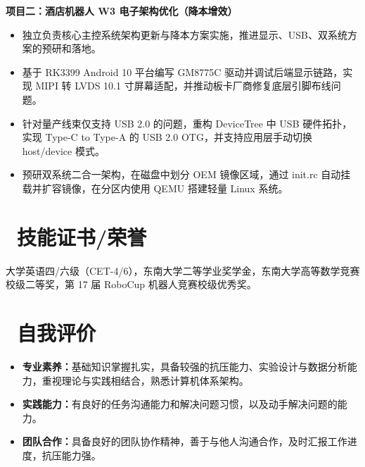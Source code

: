 \documentclass{resume}
\begin{document}
\textbf{项目二：酒店机器人 W3 电子架构优化（降本增效）}
\begin{itemize}
  \item 独立负责核心主控系统架构更新与降本方案实施，推进显示、USB、双系统方案的预研和落地。
  \item 基于 RK3399 Android 10 平台编写 GM8775C 驱动并调试后端显示链路，实现 MIPI 转 LVDS 10.1 寸屏幕适配，并推动板卡厂商修复底层引脚布线问题。
  \item 针对量产线束仅支持 USB 2.0 的问题，重构 DeviceTree 中 USB 硬件拓扑，实现 Type-C to Type-A 的 USB 2.0 OTG，并支持应用层手动切换 host/device 模式。
  \item 预研双系统二合一架构，在磁盘中划分 OEM 镜像区域，通过 init.rc 自动挂载并扩容镜像，在分区内使用 QEMU 搭建轻量 Linux 系统。
\end{itemize}


\section{\faCertificate\ 技能证书/荣誉}
大学英语四/六级（CET-4/6），东南大学二等学业奖学金，东南大学高等数学竞赛校级二等奖，第 17 届 RoboCup 机器人竞赛校级优秀奖。

\section{\faInfo\ 自我评价}
\begin{itemize}[parsep=0.5ex]
  \item \textbf{专业素养：}基础知识掌握扎实，具备较强的抗压能力、实验设计与数据分析能力，重视理论与实践相结合，熟悉计算机体系架构。
  \item \textbf{实践能力：}有良好的任务沟通能力和解决问题习惯，以及动手解决问题的能力。
  \item \textbf{团队合作：}具备良好的团队协作精神，善于与他人沟通合作，及时汇报工作进度，抗压能力强。
\end{itemize}

%
%
\end{document}
